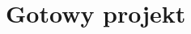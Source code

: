 \documentclass[a4paper,12pt]{book}
\begin{document}
	\chapter{Gotowy projekt}
	\label{app:gotowy_projekt}
%		
%		
%		
%		
%		
%		
\end{document}
